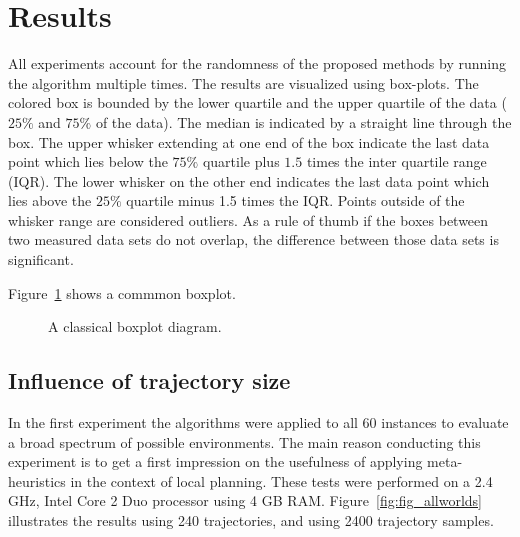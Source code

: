 \section{Results}\label{sec:testresults}
All experiments account for the randomness of the proposed methods by running the algorithm multiple times.
The results are visualized using box-plots. 
The colored box is bounded by the lower quartile and the upper quartile of the data ($25\%$ and $75\%$ of the data). 
The median is indicated by a straight line through the box. 
The upper whisker extending at one end of the box indicate the last data point which lies below the $75\%$ quartile plus $1.5$ times the
inter quartile range (IQR). The lower whisker on the other end indicates the last data point which lies above the $25\%$ quartile minus 1.5 times the IQR. 
Points outside of the whisker range are considered outliers.
As a rule of thumb if the boxes between two measured data sets do not overlap, the difference between those data sets is significant.

Figure~\ref{fig:fig_boxplot} shows a commmon boxplot. 
\begin{figure}[thpb]
     \footnotesize
      \centering
      \myfloatalign
      \setlength\fboxsep{0pt}
      \setlength\fboxrule{0.5pt}
       \caption{A classical boxplot diagram.}
      \label{fig:fig_boxplot}
   \end{figure}

\subsection{Influence of trajectory size}
In the first experiment the algorithms were applied to all 60 instances to evaluate a broad spectrum of possible environments. 
The main reason conducting this experiment is to get a first impression on the usefulness of applying meta-heuristics in the context of local planning. 
These tests were performed on a 2.4 GHz, Intel Core 2 Duo processor using 4 GB RAM.  
Figure~\ref{fig:fig_allworlds} illustrates the results using 240 trajectories, and using 2400 trajectory samples.

